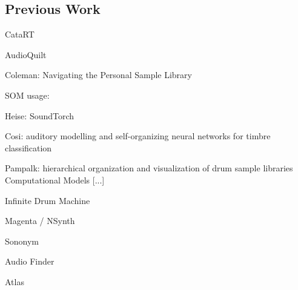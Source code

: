 \subsection{Previous Work}
\label{subsec:previous_work}

CataRT
\citet{schwarz2006}

AudioQuilt
\citet{fried2014}

Coleman: Navigating the Personal Sample Library
\citet{coleman2007}

SOM usage:

Heise: SoundTorch
\citet{heise2008}

Cosi:
auditory modelling and self-organizing neural networks for timbre classification
\citet{cosi1994}

Pampalk:
hierarchical organization and visualization of drum sample libraries
\citet{pampalk2004}
Computational Models [...]
\citet{pampalk2008}

Infinite Drum Machine

Magenta / NSynth

Sononym

Audio Finder

Atlas
